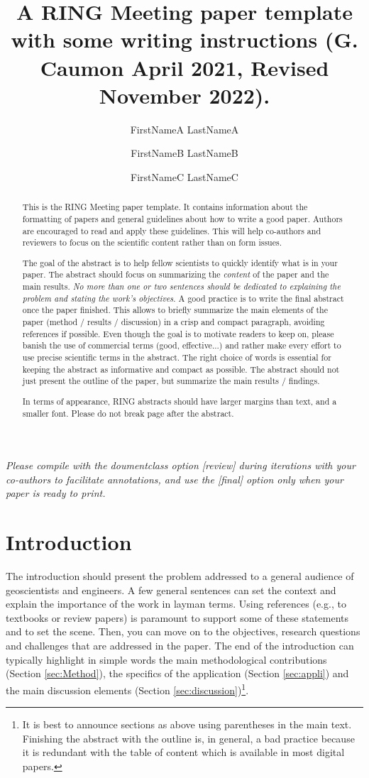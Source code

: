 \documentclass[final]{ring}
\title{A RING Meeting paper template with some writing instructions \newline (G. Caumon April 2021, Revised November 2022).}
\author[1]{FirstNameA LastNameA}
\author[2]{FirstNameB LastNameB}
\author[1,2]{FirstNameC LastNameC}
\affil[1]{RING, GeoRessources / ENSG, Université de Lorraine / CNRS, F-54000 Nancy}
\affil[2]{Team, Laboratory, Organization, Zip code, Country}
\begin{document}
\maketitle

\begin{abstract}

This is the RING Meeting paper template. It contains information about the formatting of papers and general guidelines about how to write a good paper. Authors are encouraged to read and apply these guidelines. This will help co-authors and reviewers to focus on the scientific content rather than on form issues. 

The goal of the abstract is to help fellow scientists to quickly identify what is in your paper. The abstract should focus on summarizing the \emph{content} of the paper and the main results. \emph{No more than one or two sentences should be dedicated to explaining the problem and stating the work’s objectives}. A good practice is to write the final abstract once the paper finished. This allows to briefly summarize the main elements of the paper (method / results / discussion) in a crisp and compact paragraph, avoiding references if possible. Even though the goal is to motivate readers to keep on, please banish the use of commercial terms (good, effective...) and rather make every effort to use precise scientific terms in the abstract. The right choice of words is essential for keeping the abstract as informative and compact as possible. The abstract should not just present the outline of the paper, but summarize the main results / findings. 

In terms of appearance, RING abstracts should have larger margins than text, and a smaller font. Please do not break page after the abstract.

\end{abstract}

\emph{Please compile with the doumentclass option [review] during iterations with your co-authors to facilitate annotations, and use the [final] option only when your paper is ready to print.}


\section*{Introduction}

The introduction should present the problem addressed to a general audience of geoscientists and engineers. A few general sentences can set the context and explain the importance of the work in layman terms. Using references (e.g., to textbooks or review papers) is paramount to support some of these statements and to set the scene. Then, you can move on to the objectives, research questions and challenges that are addressed in the paper. The end of the introduction can typically highlight in simple words the main methodological contributions (Section \ref{sec:Method}), the specifics of the application (Section \ref{sec:appli}) and the main discussion elements (Section \ref{sec:discussion})\footnote{It is best to announce sections as above using parentheses in the main text. Finishing the abstract with the outline is, in general, a bad practice because it is redundant with the table of content which is available in most digital papers.}.
\end{document}
